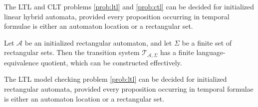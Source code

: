 \begin{cor}
The LTL and CLT problems \ref{prob:ltl} and \ref{prob:ctl} can be decided for initialized linear hybrid automata, provided every proposition occurring in temporal formulae is either an automaton location or a rectangular set.
\end{cor}

\begin{thm}
Let $\mathcal{A}$ be an initialized rectangular automaton, and let $\Sigma$ be a finite set of rectangular sets. Then the transition system $\mathcal{T}_{\mathcal{A},\Sigma}$ has a finite language-equivalence quotient, which can be constructed effectively.
\end{thm}

\begin{cor}
The LTL model checking problem \ref{prob:ltl} can be decided for initialized rectangular automata, provided every proposition occurring in temporal formulae is either an automaton location or a rectangular set.
\end{cor}





